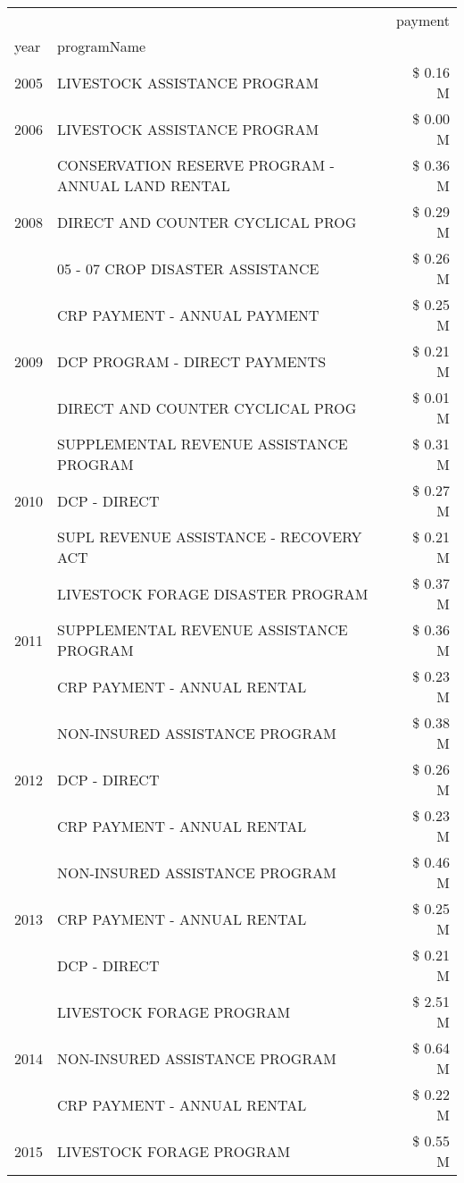 \begin{tabular}{llr}
\toprule
 &  & payment \\
year & programName &  \\
\midrule
2005 & LIVESTOCK ASSISTANCE PROGRAM & \$ 0.16 M \\
\cline{1-3}
2006 & LIVESTOCK ASSISTANCE PROGRAM & \$ 0.00 M \\
\cline{1-3}
\multirow[t]{3}{*}{2008} & CONSERVATION RESERVE PROGRAM - ANNUAL LAND RENTAL & \$ 0.36 M \\
 & DIRECT AND COUNTER CYCLICAL PROG & \$ 0.29 M \\
 & 05 - 07 CROP DISASTER ASSISTANCE & \$ 0.26 M \\
\cline{1-3}
\multirow[t]{3}{*}{2009} & CRP PAYMENT - ANNUAL PAYMENT & \$ 0.25 M \\
 & DCP PROGRAM - DIRECT PAYMENTS & \$ 0.21 M \\
 & DIRECT AND COUNTER CYCLICAL PROG & \$ 0.01 M \\
\cline{1-3}
\multirow[t]{3}{*}{2010} & SUPPLEMENTAL REVENUE ASSISTANCE PROGRAM & \$ 0.31 M \\
 & DCP - DIRECT & \$ 0.27 M \\
 & SUPL REVENUE ASSISTANCE - RECOVERY ACT & \$ 0.21 M \\
\cline{1-3}
\multirow[t]{3}{*}{2011} & LIVESTOCK FORAGE DISASTER PROGRAM & \$ 0.37 M \\
 & SUPPLEMENTAL REVENUE ASSISTANCE PROGRAM & \$ 0.36 M \\
 & CRP PAYMENT - ANNUAL RENTAL & \$ 0.23 M \\
\cline{1-3}
\multirow[t]{3}{*}{2012} & NON-INSURED ASSISTANCE PROGRAM & \$ 0.38 M \\
 & DCP - DIRECT & \$ 0.26 M \\
 & CRP PAYMENT - ANNUAL RENTAL & \$ 0.23 M \\
\cline{1-3}
\multirow[t]{3}{*}{2013} & NON-INSURED ASSISTANCE PROGRAM & \$ 0.46 M \\
 & CRP PAYMENT - ANNUAL RENTAL & \$ 0.25 M \\
 & DCP - DIRECT & \$ 0.21 M \\
\cline{1-3}
\multirow[t]{3}{*}{2014} & LIVESTOCK FORAGE PROGRAM & \$ 2.51 M \\
 & NON-INSURED ASSISTANCE PROGRAM & \$ 0.64 M \\
 & CRP PAYMENT - ANNUAL RENTAL & \$ 0.22 M \\
\cline{1-3}
\multirow[t]{3}{*}{2015} & LIVESTOCK FORAGE PROGRAM & \$ 0.55 M \\

\end{tabular}
